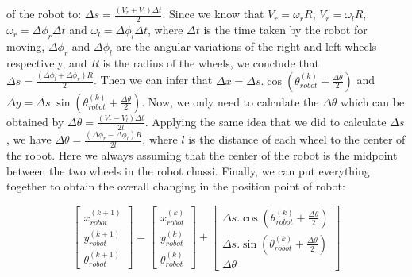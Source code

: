 \documentclass[twoside,conference,a4paper]{IEEEtran}
\begin{document}
of the robot to: $ \Delta s = \frac{(V_{r} + V_{l}) \Delta t}{2} $. Since we know that $ V_{r} = \omega_{r} R $, $ V_{r} 
= \omega_{l} R $, $ \omega_{r} = \Delta \phi_{r} \Delta t $ and $ \omega_{l} = \Delta \phi_{l} \Delta t $, where $ \Delta
 t $ is the time taken by the robot for moving, $ \Delta \phi_{r} $ and $ \Delta \phi_{l} $ are the angular 
 variations of the right and left wheels respectively, and $ R $ is the radius of the wheels, we conclude that $ \Delta s = \frac{(\Delta \phi_{l} + \Delta \phi_{r}) R}{2} $. Then we can infer that $ \Delta x = \Delta s. \cos(\theta_{robot}^{(k)} + \frac{\Delta \theta}{2}) $ and $ 
 \Delta y = \Delta s. \sin(\theta_{robot}^{(k)} + \frac{\Delta \theta}{2}) $. Now, we only need to calculate the $ \Delta
  \theta $ which can be obtained by $ \Delta \theta = \frac{(V_{r} - V_{l}) \Delta t}{2l}$. Applying the same idea that 
  we did to calculate $ \Delta s $, we have $ \Delta \theta = \frac{(\Delta \phi_{r} - \Delta \phi_{l}) R}{2l} $, where $ l $ is the distance 
  of each wheel to the center of the robot. Here we always assuming that the center of the robot is the midpoint between the two wheels in the robot chassi. 
  Finally, we can put everything together to obtain the overall changing in the position point of robot:

\begin{equation}
 \begin{bmatrix} x_{robot}^{(k+1)} \\ y_{robot}^{(k+1)} \\ \theta_{robot}^{(k+1)} \end{bmatrix}
 =
  \begin{bmatrix} x_{robot}^{(k)} \\ y_{robot}^{(k)} \\ \theta_{robot}^{(k)} \end{bmatrix}
  +
   \begin{bmatrix} \Delta s. \cos(\theta_{robot}^{(k)} + \frac{\Delta \theta}{2})  \\ 
                   \Delta s. \sin(\theta_{robot}^{(k)} + \frac{\Delta \theta}{2})  \\ 
                   \Delta \theta 
  \end{bmatrix}
  \label{equation:odometry01}
\end{equation}
\end{document}
